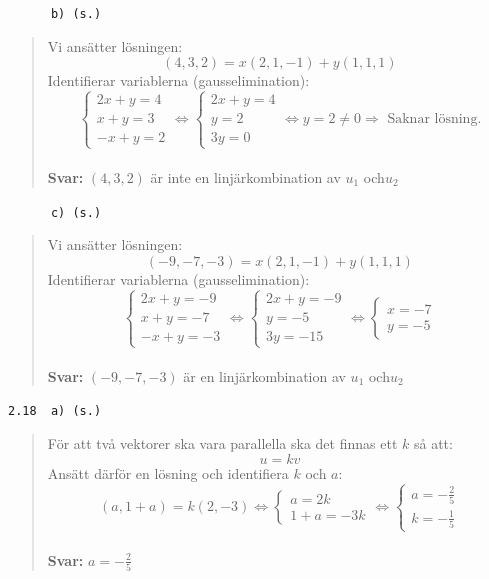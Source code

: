 \documentclass[a4paper]{article}
\newcommand{\tskcol}[1]{\textcolor{tskcol}{#1}}
\begin{document}
\texttt{\tskcol{~~~~~~b) (s.)}}
\begin{quotation}
	\noindent
	Vi ansätter lösningen:
	\[(4,3,2)=x(2,1,-1)+y(1,1,1)\]
	Identifierar variablerna (gausselimination):
	\[\begin{cases}
	2x+y=4 \\
	x+y=3 \\
	-x+y=2
	\end{cases} \Leftrightarrow
	\begin{cases}
	2x+y=4 \\
	y=2 \\
	3y=0
	\end{cases} \Leftrightarrow
	y=2\neq0 \Rightarrow \text{ Saknar lösning.}\]
	\\ 
	\textbf{Svar:} $(4,3,2)$ är inte en linjärkombination av $u_1$ och$u_2$
\end{quotation}

\texttt{\tskcol{~~~~~~c) (s.)}}
\begin{quotation}
	\noindent
	Vi ansätter lösningen:
	\[(-9,-7,-3)=x(2,1,-1)+y(1,1,1)\]
	Identifierar variablerna (gausselimination):
	\[\begin{cases}
	2x+y=-9 \\
	x+y=-7 \\
	-x+y=-3
	\end{cases} \Leftrightarrow
	\begin{cases}
	2x+y=-9 \\
	y=-5 \\
	3y=-15
	\end{cases} \Leftrightarrow
	\begin{cases}
	x=-7 \\
	y=-5
	\end{cases}\]
	\\ 
	\textbf{Svar:} $(-9,-7,-3)$ är en linjärkombination av $u_1$ och$u_2$
\end{quotation}

\texttt{\tskcol{2.18~~a) (s.)}}
\begin{quotation}
	\noindent
	För att två vektorer ska vara parallella ska det finnas ett $k$ så att:
	\[u=kv\]
	Ansätt därför en lösning och identifiera $k$ och $a$:
	\[(a,1+a)=k(2,-3) \Leftrightarrow
	\begin{cases}
	a=2k \\
	1+a=-3k
	\end{cases} \Leftrightarrow
	\begin{cases}
	a=-\frac{2}{5} \\
	k=-\frac{1}{5}
	\end{cases}\]
	\\
	\textbf{Svar:} $a=-\frac{2}{5}$
\end{quotation}
\end{document}
